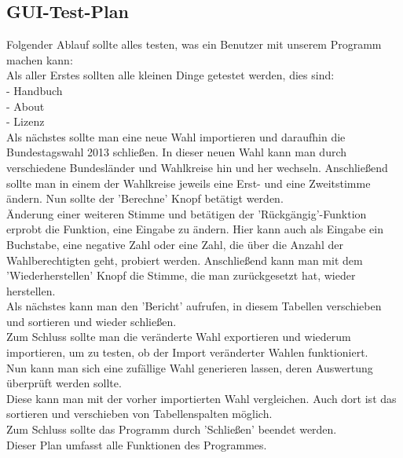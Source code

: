 \documentclass[12pt,a4paper,titlepage]{article}
\begin{document}
\subsection{GUI-Test-Plan}
Folgender Ablauf sollte alles testen, was ein Benutzer mit unserem Programm machen kann:\\
Als aller Erstes sollten alle kleinen Dinge getestet werden, dies sind:\\
 - Handbuch \\
 - About \\
 - Lizenz \\ 
Als nächstes sollte man eine neue Wahl importieren und daraufhin die Bundestagswahl 2013 schließen. In dieser neuen Wahl kann man durch verschiedene Bundesländer und Wahlkreise hin und her wechseln. Anschließend sollte man in einem der Wahlkreise
jeweils eine Erst- und eine Zweitstimme ändern. Nun sollte der 'Berechne' Knopf betätigt werden. \\
Änderung einer weiteren Stimme und betätigen der 'Rückgängig'-Funktion erprobt die Funktion, eine Eingabe zu ändern. Hier kann auch als Eingabe ein Buchstabe, eine negative Zahl oder eine Zahl, die über die Anzahl der Wahlberechtigten geht, probiert werden. Anschließend kann man mit dem 'Wiederherstellen' Knopf die Stimme, die man zurückgesetzt hat, wieder herstellen.\\
Als nächstes kann man den 'Bericht' aufrufen, in diesem Tabellen verschieben und sortieren und wieder schließen. \\
Zum Schluss sollte man die veränderte Wahl exportieren und wiederum importieren, um zu testen, ob der Import veränderter Wahlen funktioniert.\\
Nun kann man sich eine zufällige Wahl generieren lassen, deren Auswertung überprüft werden sollte. \\
Diese kann man mit der vorher importierten Wahl vergleichen. Auch dort ist das sortieren und verschieben von Tabellenspalten möglich. \\
Zum Schluss sollte das Programm durch 'Schließen' beendet werden. \\
Dieser Plan umfasst alle Funktionen des Programmes. \\
\end{document}

